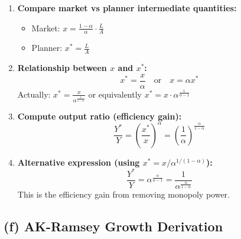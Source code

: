 \begin{enumerate}
    \item \textbf{Compare market vs planner intermediate quantities:}
    \begin{itemize}
        \item Market: $x = \frac{1-\alpha}{\alpha} \cdot \frac{L}{A}$
        \item Planner: $x^* = \frac{L}{A}$
    \end{itemize}
    
    \item \textbf{Relationship between $x$ and $x^*$:}
    \[
    x^* = \frac{x}{\alpha} \quad \text{or} \quad x = \alpha x^*
    \]
    Actually: $x^* = \frac{x}{\alpha^{\frac{1}{1-\alpha}}}$ or equivalently $x^* = x \cdot \alpha^{\frac{1}{\alpha-1}}$
    
    \item \textbf{Compute output ratio (efficiency gain):}
    \[
    \frac{Y^*}{Y} = \left(\frac{x^*}{x}\right)^{\alpha} = \left(\frac{1}{\alpha}\right)^{\frac{\alpha}{1-\alpha}}
    \]
    
    \item \textbf{Alternative expression (using $x^* = x/\alpha^{1/(1-\alpha)}$):}
    \[
    \frac{Y^*}{Y} = \alpha^{\frac{\alpha}{\alpha-1}} = \frac{1}{\alpha^{\frac{\alpha}{1-\alpha}}}
    \]
    This is the efficiency gain from removing monopoly power.
\end{enumerate}

\begin{resultbox}
\quad
{}
\end{resultbox}

\medskip

\subsection*{(f) AK-Ramsey Growth Derivation}

